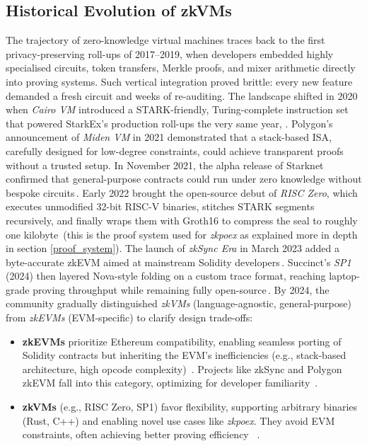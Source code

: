 \subsection{Historical Evolution of zkVMs}
The trajectory of zero-knowledge virtual machines traces back to the first privacy-preserving roll-ups of 2017–2019, when developers embedded highly specialised circuits, token transfers, Merkle proofs, and mixer arithmetic directly into proving systems.  Such vertical integration proved brittle: every new feature demanded a fresh circuit and weeks of re-auditing. The landscape shifted in 2020 when \textit{Cairo VM} introduced a STARK-friendly, Turing-complete instruction set that powered StarkEx's production roll-ups the very same year, \cite{cairo_starkex,cairo1_blog}. Polygon's announcement of \textit{Miden VM} in 2021 demonstrated that a stack-based ISA, carefully designed for low-degree constraints, could achieve transparent proofs without a trusted setup. In November 2021, the alpha release of Starknet confirmed that general-purpose contracts could run under zero knowledge without bespoke circuits\,\cite{starknet_alpha}.  Early 2022 brought the open-source debut of \textit{RISC Zero}, which executes unmodified 32-bit RISC-V binaries, stitches STARK segments recursively, and finally wraps them with Groth16 to compress the seal to roughly one kilobyte\,\cite{risc0_design_blog} (this is the proof system used for \textit{zkpoex} as explained more in depth in section \ref{proof_system}).  The launch of \textit{zkSync Era} in March 2023 added a byte-accurate zkEVM aimed at mainstream Solidity developers\,\cite{zksync_era}.  Succinct's \textit{SP1} (2024) then layered Nova-style folding on a custom trace format, reaching laptop-grade proving throughput while remaining fully open-source\,\cite{succinct_sp1}.  By 2024, the community gradually distinguished \textit{zkVMs} (language-agnostic, general-purpose) from \textit{zkEVMs} (EVM-specific) to clarify design trade-offs:
\begin{itemize}
    \item \textbf{zkEVMs} prioritize Ethereum compatibility, enabling seamless porting of Solidity contracts but inheriting the EVM's inefficiencies (e.g., stack-based architecture, high opcode complexity)~\cite{zksync_era}. Projects like zkSync and Polygon zkEVM fall into this category, optimizing for developer familiarity~\cite{polygon_miden}.
    
    \item \textbf{zkVMs} (e.g., RISC Zero, SP1) favor flexibility, supporting arbitrary binaries (Rust, C++) and enabling novel use cases like \textit{zkpoex}. They avoid EVM constraints, often achieving better proving efficiency ~\cite{succinct_sp1}.
\end{itemize}

